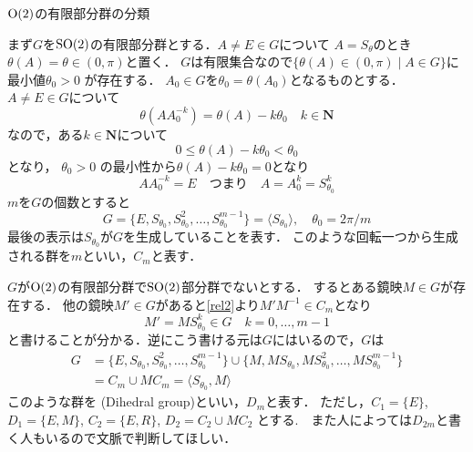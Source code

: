 \begin{Q}
     $\operatorname{O}(2)$の有限部分群の分類
\end{Q}

まず$G$を$\operatorname{SO}(2)$の有限部分群とする．$A\neq E\in G$について
$A=S_\theta$のとき $\theta(A)=\theta\in (0,\pi)$と置く．
$G$は有限集合なので$\{\theta(A)\in (0,\pi)\mid A\in G\}$に
最小値$\theta_0 > 0$ が存在する．
$A_0\in G$を$\theta_0=\theta(A_0)$となるものとする．
$A\neq E\in G$について
\[
     \theta(AA_0^{-k})=\theta(A)-k\theta_0\quad k\in \mathbf N
\]
なので，ある$k\in \mathbf N$について
\[
     0\le \theta(A)-k\theta_0 < \theta_0
\]
となり，
$\theta_0 > 0$ の最小性から$ \theta(A)-k\theta_0=0$となり
\[
     AA_0^{-k}=E\quad\text{つまり}\quad A=A_0^{k}=S_{\theta_0}^{k}
\]
$m$を$G$の個数とすると
\[
     G=\{E, S_{\theta_0},S_{\theta_0}^2,\dots,S_{\theta_0}^{m-1}\}
     =\langle S_{\theta_0}\rangle,\quad \theta_0 = 2\pi/m
\]
最後の表示は$S_{\theta_0}$が$G$を生成していることを表す．
このような回転一つから生成される群を$m$といい，$C_m$と表す．
\emptyline

$G$が$\operatorname{O}(2)$の有限部分群で$\operatorname{SO}(2)$部分群でないとする．
するとある鏡映$M\in G$が存在する．
他の鏡映$M'\in G$があると\eqref{rel2}より$M'M^{-1}\in C_m$となり
\[
     M'= MS_{\theta_0}^{k}\in G \quad  k=0,\dots,m-1
\]
と書けることが分かる．逆にこう書ける元は$G$にはいるので，$G$は
\[
\begin{split}
     G
     &=\{E, S_{\theta_0},S_{\theta_0}^2,\dots,S_{\theta_0}^{m-1}\}
     \cup\{M, MS_{\theta_0},MS_{\theta_0}^2, \dots, MS_{\theta_0}^{m-1}\}\\
     &=C_m\cup MC_m     =
     \langle S_{\theta_0}, M\rangle
\end{split}
\]
このような群を
(Dihedral group)といい，$D_{m}$と表す．
ただし，$C_1=\{E\}$, $D_1=\{E, M\}$,  $C_2=\{E, R\}$, $D_2=C_2\cup MC_2$
とする.　また人によっては$D_{2m}$と書く人もいるので文脈で判断してほしい．

